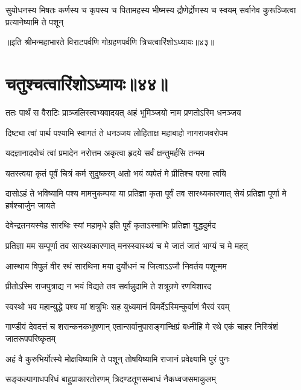 \threelineshloka
{सुयोधनस्य मिषतः कर्णस्य च कृपस्य च}
{पितामहस्य भीष्मस्य द्रौणेर्द्रोणस्य च स्वयम्}
{सर्वानेव कुरूञ्जित्वा प्रत्यानेष्यामि ते पशून्}

॥इति श्रीमन्महाभारते विराटपर्वणि गोग्रहणपर्वणि त्रिचत्वारिंशोऽध्यायः॥४३॥

\chapter{चतुश्चत्वारिंशोऽध्यायः॥४४॥}

\twolineshloka
{ततः पार्थं स वैराटिः प्राञ्जलिस्त्वभ्यवादयत्}
{अहं भूमिञ्जयो नाम प्रणतोऽस्मि धनञ्जय}


\twolineshloka
{दिष्ट्या त्वां पार्थ पश्यामि स्वागतं ते धनञ्जय}
{लोहिताक्ष महाबाहो नागराजवरोपम}


\twolineshloka
{यदज्ञानादवोचं त्वां प्रमादेन नरोत्तम}
{अकृत्वा हृदये सर्वं क्षन्तुमर्हसि तन्मम}


\twolineshloka
{यतस्त्वया कृतं पूर्वं चित्रं कर्म सुदुष्करम्}
{अतो भयं व्यपेतं मे प्रीतिश्च परमा त्वयि}


\onelineshloka
{दासोऽहं ते भविष्यामि पश्य मामनुकम्पया}
\twolineshloka
{या प्रतिज्ञा कृता पूर्वं तव सारथ्यकारणात्}
{सेयं प्रतिज्ञा पूर्णा मे हर्षश्चार्जुन जायते}


\twolineshloka
{देवेन्द्रतनयस्येह सारथिः स्यां महामृधे}
{इति पूर्वं कृताऽस्माभिः प्रतिज्ञा युद्धदुर्मद}


\twolineshloka
{प्रतिज्ञा मम सम्पूर्णा तव सारथ्यकारणात्}
{मनस्स्वास्थ्यं च मे जातं जातं भाग्यं च मे महत्}


\twolineshloka
{आस्थाय विपुलं वीर रथं सारथिना मया}
{दुर्योधनं च जित्वाऽऽजौ निवर्तय पशून्मम}




\twolineshloka
{प्रीतोऽस्मि राजपुत्राद्य न भयं विद्यते तव}
{सर्वान्नुदामि ते शत्रून्रणे रणविशारद}


\twolineshloka
{स्वस्थो भव महान्युद्धे पश्य मां शत्रुभिः सह}
{युध्यमानं विमर्देऽस्मिन्कुर्वाणं भैरवं रवम्}


\threelineshloka
{गाण्डीवं देवदत्तं च शरान्कनकभूषणान्}
{एतान्सर्वानुपासङ्गान्क्षिप्रं बध्नीहि मे रथे}
{एकं चाहर निस्त्रिंशं जातरूपपरिष्कृतम्}


\twolineshloka
{अहं वै कुरुभिर्योत्स्ये मोक्षयिष्यामि ते पशून्}
{तोषयिष्यामि राजानं प्रवेक्ष्यामि पुरं पुनः}


\twolineshloka
{सङ्कल्पागाधपरिधं बाहुप्राकारतोरणम्}
{त्रिदण्डतूणसम्बाधं नैकध्वजसमाकुलम्}


